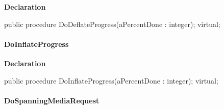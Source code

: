 \documentclass{report}
\newif\ifpdf
\begin{document}
\label{AbArcTyp.TAbArchive-DoDeflateProgress}
\begin{list}{}{
\setlength{\itemindent}{0cm}
\setlength{\listparindent}{0cm}
\setlength{\leftmargin}{\evensidemargin}
\addtolength{\leftmargin}{\tmplength}
\settowidth{\labelsep}{X}
\addtolength{\leftmargin}{\labelsep}
\setlength{\labelwidth}{\tmplength}
}
\item[\textbf{Declaration}\hfill]
\ifpdf
\begin{flushleft}
\fi
\begin{ttfamily}
public procedure DoDeflateProgress(aPercentDone : integer); virtual;\end{ttfamily}

\ifpdf
\end{flushleft}
\fi

\end{list}
\paragraph*{DoInflateProgress}\hspace*{\fill}

\label{AbArcTyp.TAbArchive-DoInflateProgress}
\begin{list}{}{
\setlength{\itemindent}{0cm}
\setlength{\listparindent}{0cm}
\setlength{\leftmargin}{\evensidemargin}
\addtolength{\leftmargin}{\tmplength}
\settowidth{\labelsep}{X}
\addtolength{\leftmargin}{\labelsep}
\setlength{\labelwidth}{\tmplength}
}
\item[\textbf{Declaration}\hfill]
\ifpdf
\begin{flushleft}
\fi
\begin{ttfamily}
public procedure DoInflateProgress(aPercentDone : integer); virtual;\end{ttfamily}

\ifpdf
\end{flushleft}
\fi

\end{list}
\paragraph*{DoSpanningMediaRequest}\hspace*{\fill}
\end{document}
